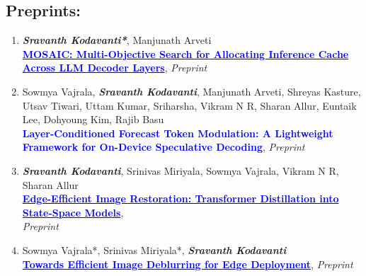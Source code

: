 \documentclass[letterpaper,11pt]{article}
\newcommand{\resumeItemListEnd}{\end{itemize}\vspace{-5pt}}
\begin{document}
\subsection*{Preprints:}

\begin{enumerate}
        \item \textit{\textbf{Sravanth Kodavanti*}}, Manjunath Arveti \\
        \href{https://arxiv.org/abs/2610.25431}{\textcolor{Blue}{\textbf{MOSAIC: Multi-Objective Search for Allocating Inference Cache Across LLM Decoder Layers}}}, \textit{Preprint}
        \item Sowmya Vajrala, \textit{\textbf{Sravanth Kodavanti}}, Manjunath Arveti, Shreyas Kasture, Utsav Tiwari, Uttam Kumar, Sriharsha, Vikram N R, Sharan Allur, Euntaik Lee, Dohyoung Kim, Rajib Basu \\
        \textcolor{Blue}{\textbf{Layer-Conditioned Forecast Token Modulation: A Lightweight Framework for On-Device Speculative Decoding}}, \textit{Preprint}
        \item \textit{\textbf{Sravanth Kodavanti}}, Srinivas Miriyala, Sowmya Vajrala, Vikram N R, Sharan Allur\\
    \href{https://arxiv.org/abs/2605.02794}{\textcolor{Blue}{\textbf{Edge-Efficient Image Restoration: Transformer Distillation into State-Space Models}}}, \\
    \textit{Preprint}
    
    \item Sowmya Vajrala*, Srinivas Miriyala*, \textit{\textbf{Sravanth Kodavanti}}\\
    \href{https://arxiv.org/abs/2601.11685}{\textcolor{Blue}{\textbf{Towards Efficient Image Deblurring for Edge Deployment}}},
    \textit{Preprint}
\end{enumerate}

\end{document}
